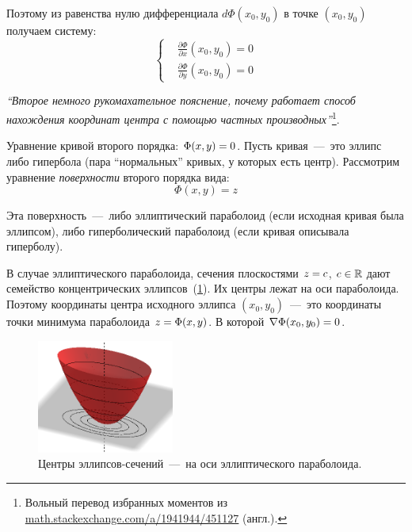\documentclass[a4paper,12pt]{article}
\begin{document}
  Поэтому из равенства нулю дифференциала $d\Phi(x_0, y_0)$ в точке $(x_0, y_0)$ получаем систему:
  \[
    \left\{
      \begin{aligned}
        &\frac{\partial \Phi}{\partial x}(x_0, y_0) = 0\\
        &\frac{\partial \Phi}{\partial y}(x_0, y_0) = 0
      \end{aligned}
    \right.
  \]
  
  
  \medskip
  
  \emph{``Второе немного рукомахательное пояснение, почему работает способ нахождения координат центра с помощью частных производных''}\footnote{Вольный перевод избранных моментов из \href{https://math.stackexchange.com/a/1941944/451127}{math.stackexchange.com/a/1941944/451127} (англ.).}.
  
  Уравнение кривой второго порядка: $\Phi(x, y) \hm= 0$.
  Пусть кривая~---~это эллипс либо гипербола (пара ``нормальных'' кривых, у которых есть центр).
  Рассмотрим уравнение \emph{поверхности} второго порядка вида:
  \[
    \Phi(x, y) = z
  \]
  
  Эта поверхность~---~либо эллиптический параболоид (если исходная кривая была эллипсом), либо гиперболический параболоид (если кривая описывала гиперболу).
  
  В случае эллиптического параболоида, сечения плоскостями $z \hm= c$, $c \hm\in \RR$ дают семейство концентрических эллипсов~(\ref{fig:elliptic-paraboloid-for-center}).
  Их центры лежат на оси параболоида.
  Поэтому координаты центра исходного эллипса $(x_0, y_0)$~---~это координаты точки минимума параболоида $z \hm= \Phi(x, y)$.
  В которой $\nabla \Phi(x_0, y_0) \hm= 0$.
  
  \begin{figure}[h]
    \centering

    \includegraphics[width=0.4\textwidth]{elliptic-paraboloid-for-center.png}
  
    \caption{Центры эллипсов-сечений~---~на оси эллиптического параболоида.}
    \label{fig:elliptic-paraboloid-for-center}
  \end{figure}
  
\end{document}
